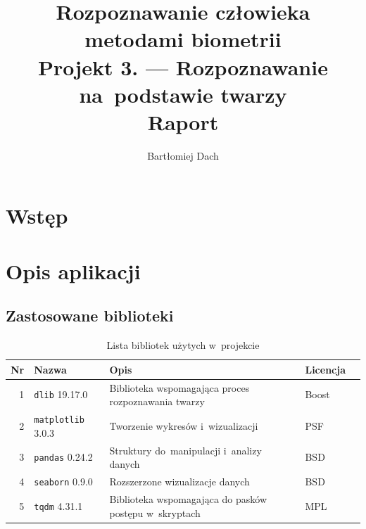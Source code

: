 \documentclass[11pt,a4paper]{article}
\begin{document}
\title{Rozpoznawanie człowieka metodami biometrii \\
\Large{
    Projekt 3. --- Rozpoznawanie na~podstawie twarzy \\
    Raport
}}
\author{Bartłomiej Dach}
\maketitle


\section{Wstęp}

\section{Opis aplikacji}

\subsection{Zastosowane biblioteki}

\begin{table}[H]
    \begin{tabularx}{\textwidth}{|r|l|X|l|c|}
        \hline
        Nr & Nazwa & Opis & Licencja & \\
        \hline
        \hline
        1 & \texttt{dlib} 19.17.0 & Biblioteka wspomagająca proces rozpoznawania twarzy & Boost & \cite{king2003} \\
        \hline
        2 & \texttt{matplotlib} 3.0.3 & Tworzenie wykresów i~wizualizacji & PSF & \cite{hunter2007} \\
        \hline
        3 & \texttt{pandas} 0.24.2 & Struktury do~manipulacji i~analizy danych & BSD & \cite{mckinney2010} \\
        \hline
        4 & \texttt{seaborn} 0.9.0 & Rozszerzone wizualizacje danych & BSD & \cite{waskom2018} \\
        \hline
        5 & \texttt{tqdm} 4.31.1 & Biblioteka wspomagająca do pasków postępu w~skryptach & MPL & \cite{dacosta2016} \\
        \hline
    \end{tabularx}
    \caption{Lista bibliotek użytych w~projekcie}
    \label{tbl:libraries}
\end{table}
\end{document}
